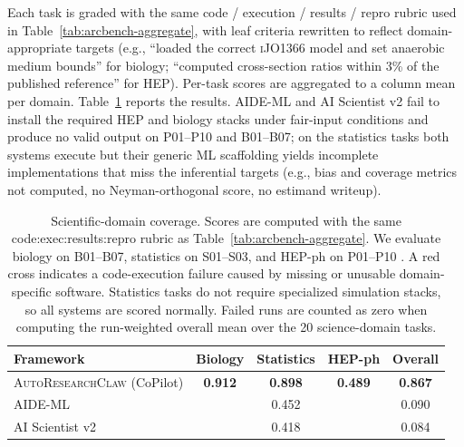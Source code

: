 \documentclass{llmxive}
\providecommand{\system}{\textsc{AutoResearchClaw}}
\providecommand{\xmark}{\ding{55}}
\begin{document}
Each task is graded with the same code / execution / results / repro rubric used in Table~\ref{tab:arcbench-aggregate}, with leaf criteria rewritten to reflect domain-appropriate targets (e.g., ``loaded the correct \textsc{iJO1366} model and set anaerobic medium bounds'' for biology; ``computed cross-section ratios within 3\% of the published reference'' for HEP).
Per-task scores are aggregated to a column mean per domain.
Table~\ref{tab:scidomain} reports the results.
AIDE-ML and AI Scientist v2 fail to install the required HEP and biology stacks under fair-input conditions and produce no valid output on \textsc{P01}--\textsc{P10} and \textsc{B01}--\textsc{B07}; on the statistics tasks both systems execute but their generic ML scaffolding yields incomplete implementations that miss the inferential targets (e.g., bias and coverage metrics not computed, no Neyman-orthogonal score, no estimand writeup).

\begin{table}[t]
\centering
\small
\begin{tabular*}{\textwidth}{@{\extracolsep{\fill}}lcccc@{}}
\toprule
\textbf{Framework} & \textbf{Biology} & \textbf{Statistics}
  & \textbf{HEP-ph} & \textbf{Overall} \\
\midrule
\system{} (CoPilot) & \textbf{0.912} & \textbf{0.898} & \textbf{0.489} & \textbf{0.867} \\
AIDE-ML             & \xmark        & 0.452          & \xmark        & 0.090 \\
AI Scientist v2     & \xmark        & 0.418          & \xmark        & 0.084 \\
\bottomrule
\end{tabular*}
\caption{Scientific-domain coverage. Scores are computed with the same
code:exec:results:repro rubric as Table~\ref{tab:arcbench-aggregate}.
We evaluate biology on \textsc{B01}--\textsc{B07}, statistics on
\textsc{S01}--\textsc{S03}, and HEP-ph on \textsc{P01}--\textsc{P10}
. A red cross indicates a code-execution failure caused by
missing or unusable domain-specific software.
Statistics tasks do not require specialized simulation stacks, so all systems
are scored normally.
Failed runs are counted as zero when computing the run-weighted overall mean
over the 20 science-domain tasks.}
\label{tab:scidomain}
\end{table}
\end{document}
